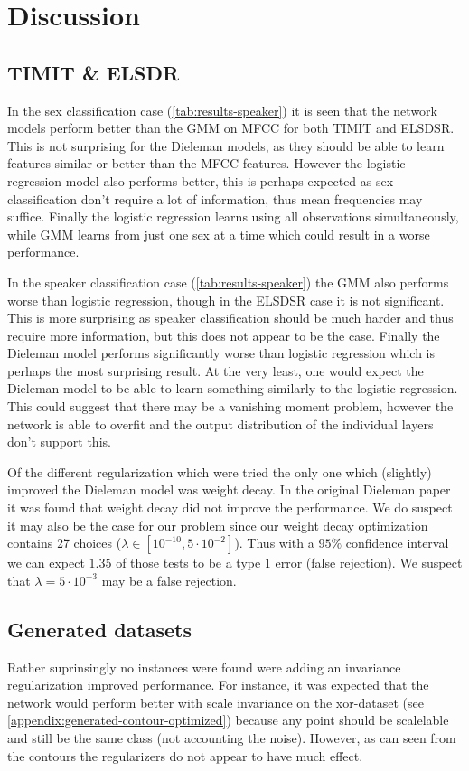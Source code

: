 \section{Discussion}
\subsection{TIMIT \& ELSDR}
In the sex classification case (\cref{tab:results-speaker}) it is seen that the network models perform better than the GMM on MFCC for both TIMIT and ELSDSR. This is not surprising for the Dieleman models, as they should be able to learn features similar or better than the MFCC features. However the logistic regression model also performs better, this is perhaps expected as sex classification don't require a lot of information, thus mean frequencies may suffice. Finally the logistic regression learns using all observations simultaneously, while GMM learns from just one sex at a time which could result in a worse performance.

In the speaker classification case (\cref{tab:results-speaker}) the GMM also performs worse than logistic regression, though in the ELSDSR case it is not significant. This is more surprising as speaker classification should be much harder and thus require more information, but this does not appear to be the case. Finally the Dieleman model performs significantly worse than logistic regression which is perhaps the most surprising result. At the very least, one would expect the Dieleman model to be able to learn something similarly to the logistic regression. This could suggest that there may be a vanishing moment problem, however the network is able to overfit and the output distribution of the individual layers don't support this.

Of the different regularization which were tried the only one which (slightly) improved the Dieleman model was weight decay. In the original Dieleman paper \cite{dieleman} it was found that weight decay did not improve the performance. We do suspect it may also be the case for our problem since our weight decay optimization contains 27 choices ($\lambda \in [10^{-10}, 5 \cdot 10^{-2}]$). Thus with a $95\%$ confidence interval we can expect $1.35$ of those tests to be a type 1 error (false rejection). We suspect that $\lambda = 5 \cdot 10^{-3}$ may be a false rejection.

\subsection{Generated datasets}
Rather suprinsingly no instances were found were adding an invariance regularization improved performance. For instance, it was expected that the network would perform better with scale invariance on the xor-dataset (see  \cref{appendix:generated-contour-optimized}) because any point should be scalelable and still be the same class (not accounting the noise). However, as can seen from the contours the regularizers do not appear to have much effect. 

